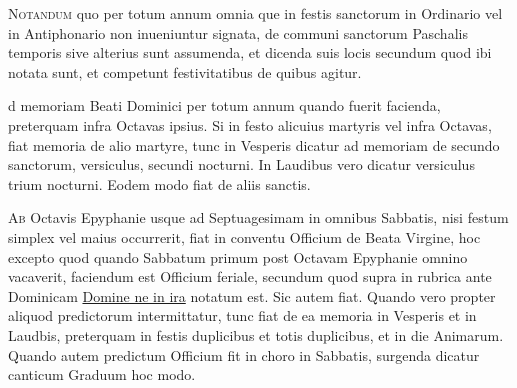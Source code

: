 \begin{multicols*}{2}
{\color{Red} }
\lettrine[lines=2]{\zallmancaps \color{Blue} N}{otandum} quo per totum annum omnia que in festis sanctorum in Ordinario vel in Antiphonario non inueniuntur signata, de communi sanctorum Paschalis temporis sive alterius sunt assumenda, et dicenda suis locis secundum quod ibi notata sunt, et competunt festivitatibus de quibus agitur.



\par {}d memoriam Beati Dominici per totum annum quando fuerit facienda, preterquam infra Octavas ipsius.
Si in festo alicuius martyris vel infra Octavas, fiat memoria de alio martyre, tunc in Vesperis dicatur ad memoriam de secundo sanctorum, versiculus, secundi nocturni. In Laudibus vero dicatur versiculus trium nocturni. Eodem modo fiat de aliis sanctis.

\lettrine[lines=2]{\zallmancaps \color{Blue} A}{b} Octavis Epyphanie usque ad Septuagesimam in omnibus Sabbatis, nisi festum simplex vel maius occurrerit, fiat in conventu Officium de Beata Virgine, hoc excepto quod quando Sabbatum primum post Octavam Epyphanie omnino vacaverit, faciendum est Officium feriale, secundum quod supra in rubrica ante Dominicam \hyperlink{domine-ne-in-ira}{Domine ne in ira} notatum est. Sic autem fiat.
Quando vero propter aliquod predictorum intermittatur, tunc fiat de ea memoria in Vesperis et in Laudbis, preterquam in festis duplicibus et totis duplicibus, et in die Animarum.
Quando autem predictum Officium fit in choro in Sabbatis, surgenda dicatur canticum Graduum hoc modo.


\end{multicols*}
